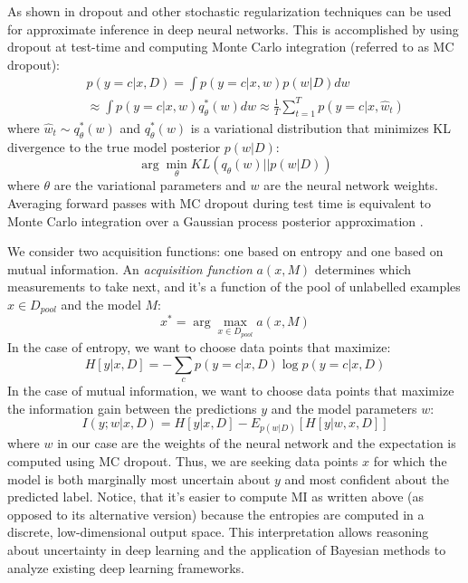 As shown in \cite{MCDropout2016} dropout \cite{Dropout2014} and other stochastic regularization techniques can be used for approximate inference in deep neural networks. This is accomplished by using dropout at test-time and computing Monte Carlo integration (referred to as MC dropout):
\begin{eqnarray}
    &&p(y=c|x, D) = \int p(y=c|x, w)p(w|D)dw \\ 
    &&\approx \int p(y=c|x,w)q_{\theta}^{\ast}(w)dw \approx \frac{1}{T}\sum_{t=1}^{T}p(y=c|x,\hat{w}_t) \nonumber
\end{eqnarray}
where $\hat{w}_{t} \sim q_{\theta}^{\ast}(w)$ and $q_{\theta}^{\ast}(w)$ is a variational distribution that minimizes KL divergence to the true model posterior $p(w|D)$:
\begin{equation}
    \arg \min_{\theta} KL(q_{\theta}(w) || p(w|D))
\end{equation}
where $\theta$ are the variational parameters and $w$ are the neural network weights. Averaging forward passes with MC dropout during test time is equivalent to Monte Carlo integration over a Gaussian process posterior approximation \cite{Gal2017}. 

We consider two acquisition functions: one based on entropy and one based on mutual information. An \textit{acquisition function} $a(x,M)$ determines which measurements to take next, and it's a function of the pool of unlabelled examples $x \in D_{pool}$ and the model $M$:
\begin{equation}
    x^{\ast} = \arg \max_{x \in D_{pool}} a(x,M)
\end{equation}
In the case of entropy, we want to choose data points that maximize:
\begin{equation}
    H[y|x, D] = -\sum_{c}p(y=c|x,D)\log p(y=c|x,D)
\end{equation}
In the case of mutual information, we want to choose data points that maximize the information gain between the predictions $y$ and the model parameters $w$:
\begin{equation}
    I(y;w|x,D) = H[y|x, D] - E_{p(w|D)}[H[y|w,x,D]]
\end{equation}
where $w$ in our case are the weights of the neural network and the expectation is computed using MC dropout. Thus, we are seeking data points $x$ for which the model is both marginally most uncertain about $y$ and most confident about the predicted label. Notice, that it's easier to compute MI as written above (as opposed to its alternative version) because the entropies are computed in a discrete, low-dimensional output space. This interpretation allows reasoning about uncertainty in deep learning and the application of Bayesian methods to analyze existing deep learning frameworks. 


